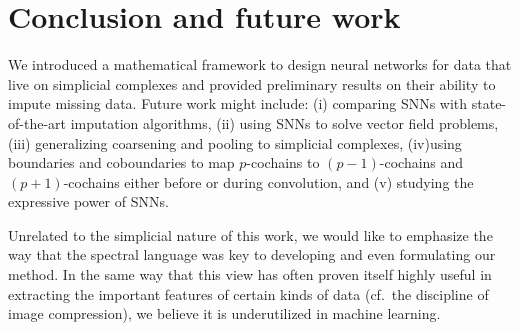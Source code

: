 \section{Conclusion and future work}

We introduced a mathematical framework to design neural networks for data that live on simplicial complexes and provided preliminary results on their ability to impute missing data.
Future work might include: (i) comparing SNNs with state-of-the-art imputation algorithms, (ii) using SNNs to solve vector field problems, (iii) generalizing coarsening and pooling to simplicial complexes, (iv)using boundaries and coboundaries to map $p$-cochains to $(p-1)$-cochains and $(p+1)$-cochains either before or during convolution, and (v) studying the expressive power of SNNs.

Unrelated to the simplicial nature of this work, we would like to emphasize the way that the spectral language was key to developing and even formulating our method. In the same way that this view has often proven itself highly useful in extracting the important features of certain kinds of data (cf.\ the discipline of image compression), we believe it is underutilized in machine learning.
